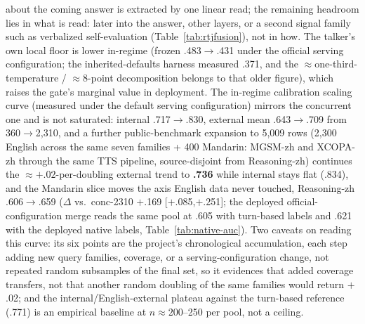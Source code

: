 about the coming answer is extracted by one linear read; the
remaining headroom lies in what is read: later into the
answer, other layers, or a second signal family such as verbalized
self-evaluation (Table~\ref{tab:rtjfusion}), not in how. The
talker's own local floor is lower
in-regime (frozen .483$\to$.431 under the official serving
configuration; the inherited-defaults harness measured .371, and the
$\approx$one-third-temperature / $\approx$8-point decomposition
belongs to that older figure), which
raises the gate's marginal value in deployment. The in-regime
calibration scaling curve (measured under the default serving
configuration) mirrors the concurrent one and is not
saturated: internal .717$\to$.830, external mean .643$\to$.709 from
360$\to$2{,}310, and a further public-benchmark expansion to 5{,}009
rows (2{,}300 English across the same seven families + 400 Mandarin:
MGSM-zh and XCOPA-zh through the same TTS pipeline, source-disjoint
from Reasoning-zh) continues the $\approx{+}.02$-per-doubling external
trend to \textbf{.736} while internal stays flat (.834), and the
Mandarin slice moves the axis English data never touched, Reasoning-zh
.606$\to$.659 ($\Delta$ vs.\ conc-2310 $+$.169 [$+$.085,$+$.251]; the
deployed official-configuration merge reads the same pool at .605
with turn-based labels and .621 with the deployed native labels,
Table~\ref{tab:native-auc}). Two caveats on reading this curve: its
six points are the project's chronological accumulation, each step
adding new query families, coverage, or a serving-configuration
change, not repeated random subsamples of the final set, so it
evidences that added coverage transfers, not that another
random doubling of the same families would return $+$.02; and the
internal/English-external plateau against the turn-based reference
(.771) is an empirical baseline at $n{\approx}200$--250 per pool,
not a ceiling.

